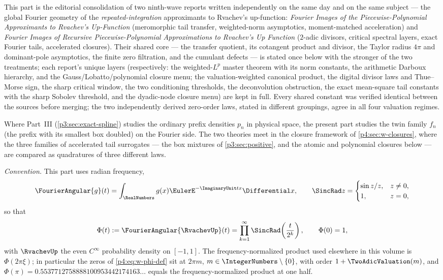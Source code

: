 \documentclass[11pt,oneside]{article}
\numberwithin{equation}{section}
\theoremstyle{definition}
\theoremstyle{remark}
\begin{document}
This part is the editorial consolidation of two ninth-wave reports written
independently on the same day and on the same subject --- the global Fourier
geometry of the \emph{repeated-integration} approximants to Rvachev's
up-function:
\emph{Fourier Images of the Piecewise-Polynomial Approximants to Rvachev's
Up-Function} (meromorphic tail transfer, weighted-norm asymptotics,
moment-matched acceleration) and
\emph{Fourier Images of Recursive Piecewise-Polynomial Approximations to
Rvachev's Up Function} ($2$-adic divisors, critical spectral layers, exact
Fourier tails, accelerated closures).  Their shared core --- the transfer
quotient, its cotangent product and divisor, the Taylor radius $4\pi$ and
dominant-pole asymptotics, the finite zero filtration, and the cumulant
defects --- is stated once below with the stronger of the two treatments;
each report's unique layers (respectively: the weighted-$L^p$ master theorem
with its norm constants, the arithmetic Darboux hierarchy, and the
Gauss/Lobatto/polynomial closure menu; the valuation-weighted canonical
product, the digital divisor laws and Thue--Morse sign, the sharp critical
window, the two conditioning thresholds, the deconvolution obstruction, the
exact mean-square tail constants with the sharp Sobolev threshold, and the
dyadic-node closure menu) are kept in full.  Every shared constant was
verified identical between the sources before merging; the two independently
derived zero-order laws, stated in different groupings, agree in all four
valuation regimes.

Where Part~III (\cref{p3:sec:exact-spline}) studies the ordinary prefix
densities $p_n$ in physical space, the present part studies the twin family
$f_n$ (the prefix with its smallest box doubled) on the Fourier side.  The
two theories meet in the closure framework of \cref{p4:sec:w-closures}, where
the three families of accelerated tail surrogates --- the box mixtures of
\cref{p3:sec:positive}, and the atomic and polynomial closures below ---
are compared as quadratures of three different laws.

\emph{Convention.}  This part uses radian frequency,
\begin{equation}
 \FourierAngular{g}(t)=\int_{\RealNumbers}g(x)\EulerE^{-\ImaginaryUnit tx}\Differential x,
 \qquad
 \SincRad z=\begin{cases}\sin z/z,&z\ne0,\\1,&z=0,\end{cases}
 \label{p4:eq:w-fourier-convention}
\end{equation}
so that
\begin{equation}
 \Phi(t):=\FourierAngular{\RvachevUp}(t)=\prod_{k=1}^{\infty}\SincRad\!\left(\frac{t}{2^k}\right),
 \qquad \Phi(0)=1,
 \label{p4:eq:w-phi-def}
\end{equation}
with $\RvachevUp$ the even $C^\infty$ probability density on $[-1,1]$.  The
frequency-normalized product used elsewhere in this volume is
$\Phi(2\pi\xi)$; in particular the zeros of \eqref{p4:eq:w-phi-def} sit at
$2\pi m$, $m\in\IntegerNumbers\setminus\{0\}$, with order $1+\TwoAdicValuation(m)$, and
$\Phi(\pi)=0.5537712758888100953442174163\ldots$ equals the
frequency-normalized product at one half.
\end{document}

